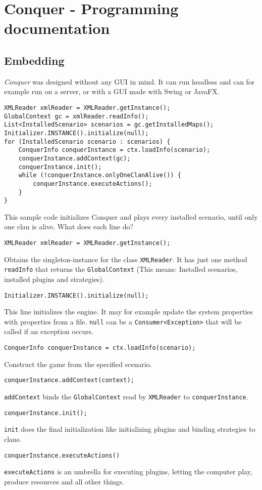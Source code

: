 \documentclass{article}
\begin{document}
\tableofcontents
\newpage
\section{Conquer - Programming documentation}
\subsection{Embedding}
\textit{Conquer} was designed without any GUI in mind. It can run headless and can for example run on a server, or with a GUI made with Swing or JavaFX.
\begin{verbatim}
XMLReader xmlReader = XMLReader.getInstance();
GlobalContext gc = xmlReader.readInfo();
List<InstalledScenario> scenarios = gc.getInstalledMaps();
Initializer.INSTANCE().initialize(null);
for (InstalledScenario scenario : scenarios) {
	ConquerInfo conquerInstance = ctx.loadInfo(scenario);
	conquerInstance.addContext(gc);
	conquerInstance.init();
	while (!conquerInstance.onlyOneClanAlive()) {
		conquerInstance.executeActions();
	}
}
\end{verbatim}
This sample code initializes Conquer and plays every installed scenario, until only one clan is alive.\newline
What does each line do?\newline
\begin{verbatim}
XMLReader xmlReader = XMLReader.getInstance();
\end{verbatim}
Obtains the singleton-instance for the class \texttt{XMLReader}. It has just one method \texttt{readInfo} that returns the \texttt{GlobalContext} (This means: Installed scenarios,
installed plugins and strategies).
\begin{verbatim}
Initializer.INSTANCE().initialize(null);
\end{verbatim}
This line initializes the engine. It may for example update the system properties with properties from a file. \texttt{null} can be a \texttt{Consumer<Exception>} that will be called if an exception 
occurs.
\begin{verbatim}
ConquerInfo conquerInstance = ctx.loadInfo(scenario);
\end{verbatim}
Construct the game from the specified scenario.
\begin{verbatim}
conquerInstance.addContext(context);
\end{verbatim}
\texttt{addContext} binds the \texttt{GlobalContext} read by \texttt{XMLReader} to \texttt{conquerInstance}.
\begin{verbatim}
conquerInstance.init();
\end{verbatim}
\texttt{init} does the final initialization like initializing plugins and binding strategies to clans.
\begin{verbatim}
conquerInstance.executeActions()
\end{verbatim}
\texttt{executeActions} is an umbrella for executing plugins, letting the computer play, produce resources and all other things.\newline
\end{document}
